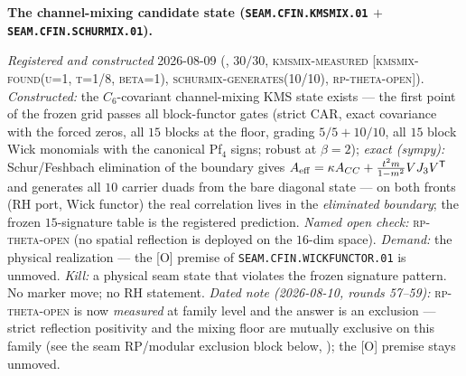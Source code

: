 \documentclass[11pt,a4paper]{article}
\begin{document}
\par\smallskip\noindent\textbf{The channel-mixing candidate
state (\texttt{SEAM.CFIN.\allowbreak KMSMIX.01} $+$
\texttt{SEAM.CFIN.\allowbreak SCHURMIX.01}).}
{\sloppy
\emph{Registered and constructed} 2026-08-09
(, $30/30$,
\textsc{kmsmix-measured [kmsmix-found(u=1, t=1/8, beta=1),
schurmix-generates(10/10), rp-theta-open]}).  \emph{Constructed:}
the $C_6$-covariant channel-mixing KMS state exists --- the
first point of the frozen grid passes all block-functor gates
(strict CAR, exact covariance with the forced zeros, all $15$
blocks at the floor, grading $5/5 + 10/10$, all $15$ block Wick
monomials with the canonical Pf$_4$ signs; robust at $\beta =
2$); \emph{exact (sympy):} Schur/Feshbach elimination of the
boundary gives $A_{\rm eff} = \kappa A_{CC} +
\tfrac{t^2 m}{1 - m^2} V J_3 V^{\mathsf T}$ and generates all
$10$ carrier duads from the bare diagonal state --- on both
fronts (RH port, Wick functor) the real correlation lives in
the \emph{eliminated boundary}; the frozen $15$-signature table
is the registered prediction.  \emph{Named open check:}
\textsc{rp-theta-open} (no spatial reflection is deployed on the
$16$-dim space).  \emph{Demand:} the physical realization ---
the [O] premise of \texttt{SEAM.CFIN.WICKFUNCTOR.01} is
unmoved.  \emph{Kill:} a physical seam state that violates the
frozen signature pattern.  No marker move; no RH statement.
\emph{Dated note (2026-08-10, rounds 57--59):}
\textsc{rp-theta-open} is now \emph{measured} at family level and
the answer is an exclusion --- strict reflection positivity and
the mixing floor are mutually exclusive on this family (see the
seam RP/modular exclusion block below,
); the [O] premise stays
unmoved.\par}
\end{document}
